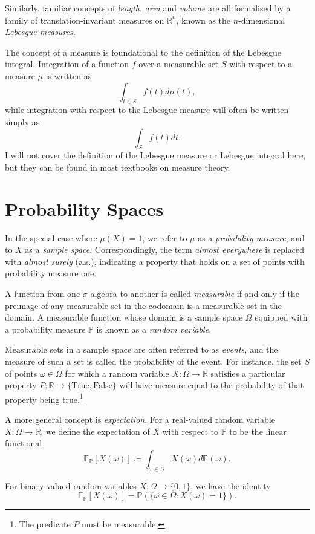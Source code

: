 \documentclass[honours,12pt]{unswthesis}
\numberwithin{equation}{section}
\begin{document}
Similarly, familiar concepts of \textit{length}, \textit{area} and \textit{volume} are all formalised by a family of translation-invariant measures on $\mathbb{R}^n$, known as the $n$-dimensional \textit{Lebesgue measures}.

The concept of a measure is foundational to the definition of the Lebesgue integral. Integration of a function $f$ over a measurable set $S$ with respect to a measure $\mu$ is written as
$$\int_{t\in S} f(t) d\mu(t),$$
while integration with respect to the Lebesgue measure will often be written simply as
$$\int_S f(t)dt.$$
I will not cover the definition of the Lebesgue measure or Lebesgue integral here, but they can be found in most textbooks on measure theory.

\section{Probability Spaces}
In the special case where $\mu(X)=1$, we refer to $\mu$ as a \textit{probability measure}, and to $X$ as a \textit{sample space}. Correspondingly, the term \textit{almost everywhere} is replaced with \textit{almost surely} (a.s.), indicating a property that holds on a set of points with probability measure one.

A function from one $\sigma$-algebra to another is called \textit{measurable} if and only if the preimage of any measurable set in the codomain is a measurable set in the domain. A measurable function whose domain is a sample space $\Omega$ equipped with a probability measure $\mathbb{P}$ is known as a \textit{random variable}.

Measurable sets in a sample space are often referred to as \textit{events}, and the measure of such a set is called the probability of the event. For instance, the set $S$ of points $\omega\in\Omega$ for which a random variable $X:\Omega\to\mathbb{R}$ satisfies a particular property $P:\mathbb{R}\to\{\mathrm{True},\mathrm{False}\}$ will have measure equal to the probability of that property being true.\footnote{The predicate $P$ must be measurable.}

A more general concept is \textit{expectation}. For a real-valued random variable $X:\Omega\to \mathbb{R}$, we define the expectation of $X$ with respect to $\mathbb{P}$ to be the linear functional
$$\mathbb{E}_{\mathbb{P}}[X(\omega)] \coloneq \int_{\omega\in\Omega} X(\omega)d\mathbb{P}(\omega).$$

For binary-valued random variables $X:\Omega\to\{0,1\}$, we have the identity
$$\mathbb{E}_\mathbb{P}[X(\omega)] = \mathbb{P}\left(\{\omega\in\Omega : X(\omega)=1\}\right).$$
\end{document}
